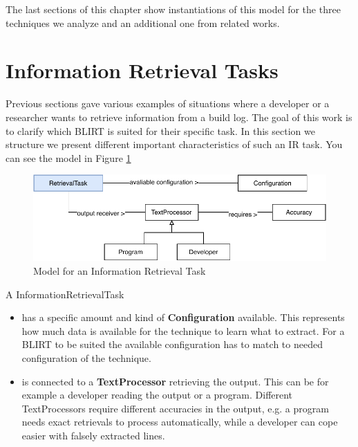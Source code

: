 \documentclass[\myrootdir/main.tex]{subfiles}
\begin{document}
The last sections of this chapter show instantiations of this model for the three techniques we analyze and an additional one from related works.

\section{Information Retrieval Tasks}
Previous sections gave various examples of situations where a developer or a researcher wants to retrieve information from a build log.
The goal of this work is to clarify which BLIRT is suited for their specific task.
In this section we structure we present different important characteristics of such an IR task.
You can see the model in Figure \ref{fig:model-ir-task}

\begin{figure}[h]
	\centering
	\includegraphics[width=\textwidth, clip]{img/ir-task.pdf}
	\caption{Model for an Information Retrieval Task}
	\label{fig:model-ir-task}
\end{figure}

A InformationRetrievalTask
\begin{itemize}
	\item has a specific amount and kind of \textbf{Configuration} available.
	      This represents how much data is available for the technique to learn what to extract.
	      For a BLIRT to be suited the available configuration has to match to needed configuration of the technique.
	\item is connected to a \textbf{TextProcessor} retrieving the output.
	      This can be for example a developer reading the output or a program.
	      Different TextProcessors require different accuracies in the output, e.g. a program needs exact retrievals to process automatically, while a developer can cope easier with falsely extracted lines.
\end{itemize}
\end{document}
